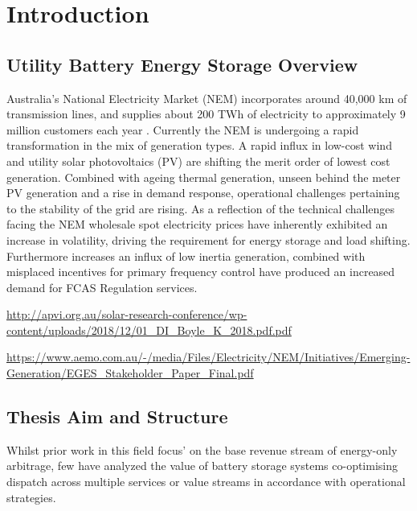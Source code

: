 

\chapter{Introduction}
\section{ Utility Battery Energy Storage Overview }

Australia's National Electricity Market (NEM) incorporates around 40,000 km of transmission lines, and supplies about 200 TWh of electricity to approximately 9 million customers each year \parencite{AEMO_NEM}. Currently the NEM is undergoing a rapid transformation in the mix of generation types. A rapid influx in low-cost wind and utility solar photovoltaics (PV) are shifting the merit order of lowest cost generation. Combined with ageing thermal generation, unseen behind the meter PV generation and a rise in demand response, operational challenges pertaining to the stability of the grid are rising. As a reflection of the technical challenges facing the NEM wholesale spot electricity prices have inherently exhibited an increase in volatility, driving the requirement for energy storage and load shifting. Furthermore increases an influx of low inertia generation, combined with misplaced incentives for primary frequency control have produced an increased demand for FCAS Regulation services. 

\url{http://apvi.org.au/solar-research-conference/wp-content/uploads/2018/12/01_DI_Boyle_K_2018.pdf.pdf}

\url{https://www.aemo.com.au/-/media/Files/Electricity/NEM/Initiatives/Emerging-Generation/EGES_Stakeholder_Paper_Final.pdf}

\section{ Thesis Aim and Structure }
Whilst prior work in this field focus' on the base revenue stream of energy-only arbitrage, few have analyzed the value of battery storage systems co-optimising dispatch across multiple services or value streams in accordance with operational strategies.